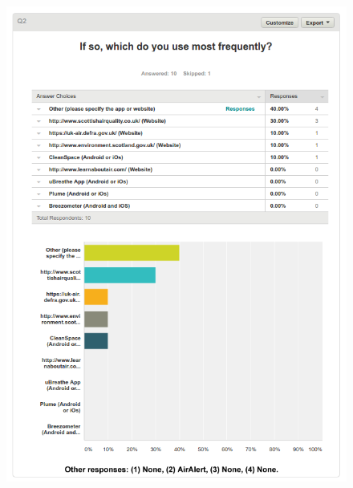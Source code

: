 \begin{figure}[H]
\begin{adjustbox}{width=1\textwidth,center=\textwidth}
  \centering
  \includegraphics[scale=1]{surveys/q2.png}
\end{adjustbox}
\end{figure}
